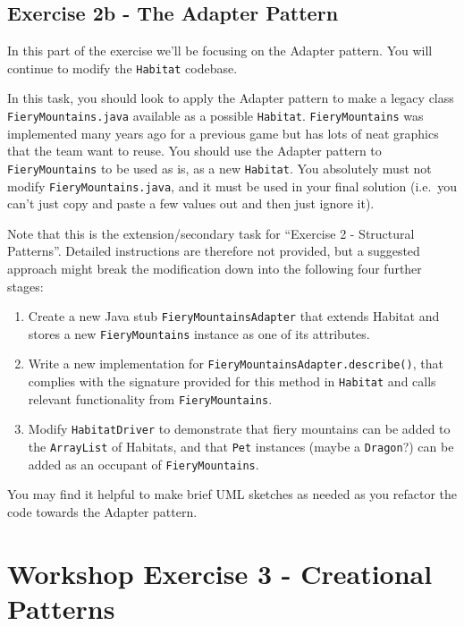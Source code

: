 \documentclass[
]{book}
\providecommand{\tightlist}{%
  \setlength{\itemsep}{0pt}\setlength{\parskip}{0pt}}
\begin{document}
\hypertarget{adapter}{%
\subsection{Exercise 2b - The Adapter Pattern}\label{adapter}}

In this part of the exercise we'll be focusing on the Adapter pattern. You will continue to modify the \texttt{Habitat} codebase.

In this task, you should look to apply the Adapter pattern to make a legacy class \texttt{FieryMountains.java} available as a possible \texttt{Habitat}.
\texttt{FieryMountains} was implemented many years ago for a previous game but has lots of neat graphics that the team want to reuse. You should use the Adapter pattern to \texttt{FieryMountains} to be used as is, as a new \texttt{Habitat}. You absolutely must not modify \texttt{FieryMountains.java}, and it must be used in your final solution (i.e.~you can't just copy and paste a few values out and then just ignore it).

Note that this is the extension/secondary task for ``Exercise 2 - Structural Patterns''. Detailed instructions are therefore not provided, but a suggested approach might break the modification down into the following four further stages:

\begin{enumerate}
\def\labelenumi{\arabic{enumi}.}
\tightlist
\item
  Create a new Java stub \texttt{FieryMountainsAdapter} that extends Habitat and stores a new \texttt{FieryMountains} instance as one of its attributes.
\item
  Write a new implementation for \texttt{FieryMountainsAdapter.describe()}, that complies with the signature provided for this method in \texttt{Habitat} and calls relevant functionality from \texttt{FieryMountains}.
\item
  Modify \texttt{HabitatDriver} to demonstrate that fiery mountains can be added to the \texttt{ArrayList} of Habitats, and that \texttt{Pet} instances (maybe a \texttt{Dragon}?) can be added as an occupant of \texttt{FieryMountains}.
\end{enumerate}

You may find it helpful to make brief UML sketches as needed as you refactor the code towards the Adapter pattern.

\hypertarget{creational}{%
\section{Workshop Exercise 3 - Creational Patterns}\label{creational}}
\end{document}

